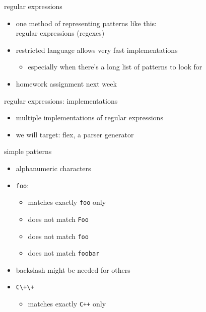 
\begin{frame}{regular expressions}
    \begin{itemize}
    \item one method of representing patterns like this: \\
          regular expressions (regexes)
    \item restricted language allows very fast implementations
        \begin{itemize}
        \item especially when there's a long list of patterns to look for
        \end{itemize}
    \item homework assignment next week
    \end{itemize}
\end{frame}

\begin{frame}{regular expressions: implementations}
    \begin{itemize}
    \item multiple implementations of regular expressions
    \item we will target: flex, a parser generator
    \end{itemize}
\end{frame}

\begin{frame}[fragile,label=simplePat]{simple patterns}
    \begin{itemize}
    \item alphanumeric characters 
    \item {\tt foo}:
        \begin{itemize}
        \item matches exactly {\tt foo} only
        \item does not match {\tt Foo}
        \item does not match \verb*|foo |
        \item does not match {\tt foobar}
        \end{itemize}
    \item backslash might be needed for others
    \item \verb|C\+\+|
        \begin{itemize}
        \item matches exactly {\tt C++} only
        \end{itemize}
    \end{itemize}
\end{frame}

